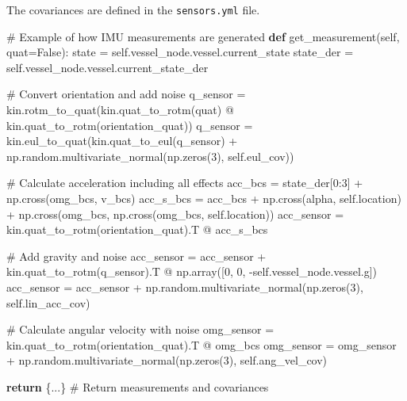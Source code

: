 \documentclass[
  letterpaper,
  DIV=11,
  numbers=noendperiod]{scrreprt}
\newenvironment{Shaded}{\begin{snugshade}}{\end{snugshade}}
\newcommand{\CommentTok}[1]{\textcolor[rgb]{0.37,0.37,0.37}{#1}}
\newcommand{\ControlFlowTok}[1]{\textcolor[rgb]{0.00,0.23,0.31}{\textbf{#1}}}
\newcommand{\DecValTok}[1]{\textcolor[rgb]{0.68,0.00,0.00}{#1}}
\newcommand{\KeywordTok}[1]{\textcolor[rgb]{0.00,0.23,0.31}{\textbf{#1}}}
\newcommand{\NormalTok}[1]{\textcolor[rgb]{0.00,0.23,0.31}{#1}}
\newcommand{\OperatorTok}[1]{\textcolor[rgb]{0.37,0.37,0.37}{#1}}
\newcommand{\VariableTok}[1]{\textcolor[rgb]{0.07,0.07,0.07}{#1}}
\begin{document}
The covariances are defined in the \texttt{sensors.yml} file.

\begin{Shaded}
\begin{Highlighting}[]
\CommentTok{\# Example of how IMU measurements are generated}
\KeywordTok{def}\NormalTok{ get\_measurement(}\VariableTok{self}\NormalTok{, quat}\OperatorTok{=}\VariableTok{False}\NormalTok{):}
\NormalTok{    state }\OperatorTok{=} \VariableTok{self}\NormalTok{.vessel\_node.vessel.current\_state}
\NormalTok{    state\_der }\OperatorTok{=} \VariableTok{self}\NormalTok{.vessel\_node.vessel.current\_state\_der}
    
    \CommentTok{\# Convert orientation and add noise}
\NormalTok{    q\_sensor }\OperatorTok{=}\NormalTok{ kin.rotm\_to\_quat(kin.quat\_to\_rotm(quat) }\OperatorTok{@}\NormalTok{ kin.quat\_to\_rotm(orientation\_quat))}
\NormalTok{    q\_sensor }\OperatorTok{=}\NormalTok{ kin.eul\_to\_quat(kin.quat\_to\_eul(q\_sensor) }\OperatorTok{+}\NormalTok{ np.random.multivariate\_normal(np.zeros(}\DecValTok{3}\NormalTok{), }\VariableTok{self}\NormalTok{.eul\_cov))}
    
    \CommentTok{\# Calculate acceleration including all effects}
\NormalTok{    acc\_bcs }\OperatorTok{=}\NormalTok{ state\_der[}\DecValTok{0}\NormalTok{:}\DecValTok{3}\NormalTok{] }\OperatorTok{+}\NormalTok{ np.cross(omg\_bcs, v\_bcs)}
\NormalTok{    acc\_s\_bcs }\OperatorTok{=}\NormalTok{ acc\_bcs }\OperatorTok{+}\NormalTok{ np.cross(alpha, }\VariableTok{self}\NormalTok{.location) }\OperatorTok{+}\NormalTok{ np.cross(omg\_bcs, np.cross(omg\_bcs, }\VariableTok{self}\NormalTok{.location))}
\NormalTok{    acc\_sensor }\OperatorTok{=}\NormalTok{ kin.quat\_to\_rotm(orientation\_quat).T }\OperatorTok{@}\NormalTok{ acc\_s\_bcs}
    
    \CommentTok{\# Add gravity and noise}
\NormalTok{    acc\_sensor }\OperatorTok{=}\NormalTok{ acc\_sensor }\OperatorTok{+}\NormalTok{ kin.quat\_to\_rotm(q\_sensor).T }\OperatorTok{@}\NormalTok{ np.array([}\DecValTok{0}\NormalTok{, }\DecValTok{0}\NormalTok{, }\OperatorTok{{-}}\VariableTok{self}\NormalTok{.vessel\_node.vessel.g])}
\NormalTok{    acc\_sensor }\OperatorTok{=}\NormalTok{ acc\_sensor }\OperatorTok{+}\NormalTok{ np.random.multivariate\_normal(np.zeros(}\DecValTok{3}\NormalTok{), }\VariableTok{self}\NormalTok{.lin\_acc\_cov)}

    \CommentTok{\# Calculate angular velocity with noise}
\NormalTok{    omg\_sensor }\OperatorTok{=}\NormalTok{ kin.quat\_to\_rotm(orientation\_quat).T }\OperatorTok{@}\NormalTok{ omg\_bcs}
\NormalTok{    omg\_sensor }\OperatorTok{=}\NormalTok{ omg\_sensor }\OperatorTok{+}\NormalTok{ np.random.multivariate\_normal(np.zeros(}\DecValTok{3}\NormalTok{), }\VariableTok{self}\NormalTok{.ang\_vel\_cov)}

    \ControlFlowTok{return}\NormalTok{ \{...\}  }\CommentTok{\# Return measurements and covariances}
\end{Highlighting}
\end{Shaded}
\end{document}
